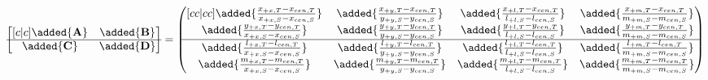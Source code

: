 \label{sec:appc}
\begin{equation}
\centering
    \begin{bmatrix}[c | c]
        \added{\mathbf{A}} & \added{\mathbf{B}} \\
        \hline
        \added{\mathbf{C}} & \added{\mathbf{D}} \\
    \end{bmatrix} =
    \renewcommand\arraystretch{1}
    \begin{pmatrix}[c c | c c]
        \added{\frac{x_{+x,T} - x_{cen,T}}{x_{+x,S} - x_{cen,S}}} & \added{\frac{x_{+y,T} - x_{cen,T}}{y_{+y,S} - y_{cen,S}}} & \added{\frac{x_{+l,T} - x_{cen,T}}{l_{+l,S} - l_{cen,S}}} & 
        \added{\frac{x_{+m,T} - x_{cen,T}}{m_{+m,S} - m_{cen,S}}} \\
        \added{\frac{y_{+x,T} - y_{cen,T}}{x_{+x,S} - x_{cen,S}}} & \added{\frac{y_{+y,T} - y_{cen,T}}{y_{+y,S} - y_{cen,S}}} & \added{\frac{y_{+l,T} - y_{cen,T}}{l_{+l,S} - l_{cen,S}}} & 
        \added{\frac{y_{+m,T} - y_{cen,T}}{m_{+m,S} - m_{cen,S}}} \\
        \hline 
        \added{\frac{l_{+x,T} - l_{cen,T}}{x_{+x,S} - x_{cen,S}}} & \added{\frac{l_{+y,T} - l_{cen,T}}{y_{+y,S} - y_{cen,S}}} & \added{\frac{l_{+l,T} - l_{cen,T}}{l_{+l,S} - l_{cen,S}}} & 
        \added{\frac{l_{+m,T} - l_{cen,T}}{m_{+m,S} - m_{cen,S}}}\\
        \added{\frac{m_{+x,T} - m_{cen,T}}{x_{+x,S} - x_{cen,S}}} & \added{\frac{m_{+y,T} - m_{cen,T}}{y_{+y,S} - y_{cen,S}}} & \added{\frac{m_{+l,T} - m_{cen,T}}{l_{+l,S} - l_{cen,S}}} & 
        \added{\frac{m_{+m,T} - m_{cen,T}}{m_{+m,S} - m_{cen,S}}} \\
    \end{pmatrix}
\label{eq:total_abcd_matrix}
\end{equation}

